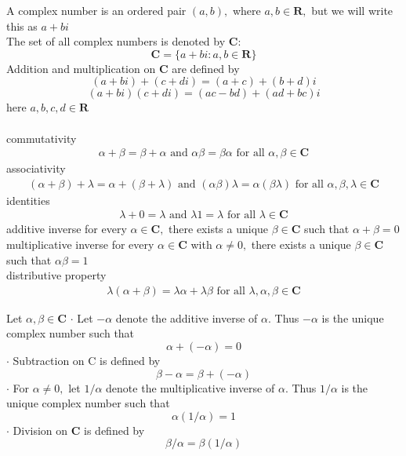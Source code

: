 
A complex number is an ordered pair $(a, b),$ where $a, b \in \mathbf{R},$ but we will write this as $a+b i$ \\
The set of all complex numbers is denoted by $\mathbf{C}:$
$$
\mathbf{C}=\{a+b i: a, b \in \mathbf{R}\}
$$
Addition and multiplication on $\mathbf{C}$ are defined by
$$
(a+b i)+(c+d i) =(a+c)+(b+d) i
$$
$$
(a+b i)(c+d i) =(a c-b d)+(a d+b c) i
$$
here $a, b, c, d \in \mathbf{R}$ \\

 \\
commutativity
\begin{align*}
\alpha+\beta=\beta+\alpha \text { and } \alpha \beta=\beta \alpha \text { for all } \alpha, \beta \in \mathbf{C}
\end{align*}
associativity
\begin{align*}
(\alpha+\beta)+\lambda=\alpha+(\beta+\lambda) \text { and }(\alpha \beta) \lambda=\alpha(\beta \lambda) \text { for all } \alpha, \beta, \lambda \in \mathbf{C}
\end{align*}
identities
\begin{align*}
\lambda+0=\lambda \text { and } \lambda 1=\lambda \text { for all } \lambda \in \mathbf{C}
\end{align*}
additive inverse for every $\alpha \in \mathbf{C},$ there exists a unique $\beta \in \mathbf{C}$ such that $\alpha+\beta=0$ \\
multiplicative inverse for every $\alpha \in \mathbf{C}$ with $\alpha \neq 0,$ there exists a unique $\beta \in \mathbf{C}$ such that $\alpha \beta=1$ \\
distributive property
\begin{align*}
\lambda(\alpha+\beta)=\lambda \alpha+\lambda \beta \text { for all } \lambda, \alpha, \beta \in \mathbf{C}
\end{align*}

Let $\alpha, \beta \in \mathbf{C}$
$\cdot$ Let $-\alpha$ denote the additive inverse of $\alpha .$ Thus $-\alpha$ is the unique complex number such that
$$
\alpha+(-\alpha)=0
$$
$\cdot$ Subtraction on $\mathrm{C}$ is defined by
$$
\beta-\alpha=\beta+(-\alpha)
$$
$\cdot$ For $\alpha \neq 0,$ let $1 / \alpha$ denote the multiplicative inverse of $\alpha .$ Thus $1 / \alpha$ is the unique complex number such that
$$
\alpha(1 / \alpha)=1
$$
$\cdot$ Division on $\mathbf{C}$ is defined by
$$
\beta / \alpha=\beta(1 / \alpha)
$$

